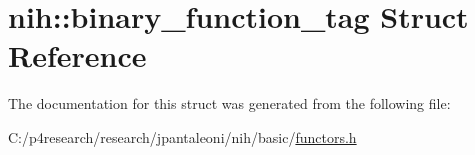 \hypertarget{structnih_1_1binary__function__tag}{
\section{nih\-:\-:binary\-\_\-function\-\_\-tag \-Struct \-Reference}
\label{structnih_1_1binary__function__tag}
}


\-The documentation for this struct was generated from the following file\-:\begin{DoxyCompactItemize}
\item 
\-C\-:/p4research/research/jpantaleoni/nih/basic/\hyperlink{functors_8h}{functors.\-h}\end{DoxyCompactItemize}
